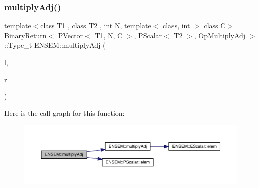 \subsubsection{\texorpdfstring{multiplyAdj()}{multiplyAdj()}}
{\footnotesize\ttfamily template$<$class T1 , class T2 , int N, template$<$ class, int $>$ class C$>$ \\
\mbox{\hyperlink{structENSEM_1_1BinaryReturn}{Binary\+Return}}$<$ \mbox{\hyperlink{classENSEM_1_1PVector}{P\+Vector}}$<$ T1, \mbox{\hyperlink{operator__name__util_8cc_a7722c8ecbb62d99aee7ce68b1752f337}{N}}, C $>$, \mbox{\hyperlink{classENSEM_1_1PScalar}{P\+Scalar}}$<$ T2 $>$, \mbox{\hyperlink{structENSEM_1_1OpMultiplyAdj}{Op\+Multiply\+Adj}} $>$\+::Type\+\_\+t E\+N\+S\+E\+M\+::multiply\+Adj (\begin{DoxyParamCaption}\item[{const \mbox{\hyperlink{classENSEM_1_1PVector}{P\+Vector}}$<$ T1, \mbox{\hyperlink{operator__name__util_8cc_a7722c8ecbb62d99aee7ce68b1752f337}{N}}, C $>$ \&}]{l,  }\item[{const \mbox{\hyperlink{classENSEM_1_1PScalar}{P\+Scalar}}$<$ T2 $>$ \&}]{r }\end{DoxyParamCaption})\hspace{0.3cm}{\ttfamily [inline]}}

Here is the call graph for this function\+:\nopagebreak
\begin{figure}[H]
\begin{center}
\leavevmode
\includegraphics[width=350pt]{d3/dc4/group__primvector_gab03f792e64e0e2073c0ab9f04fa4518f_cgraph}
\end{center}
\end{figure}
\mbox{\label{group__primvector_ga345fa1d5e68f5801446f6ff69feb2121}} 
